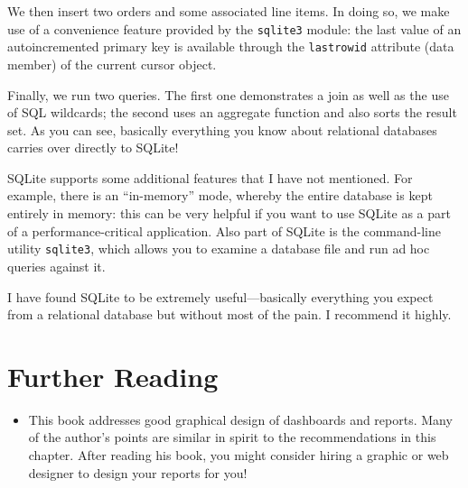 We then insert two orders and some associated line items. In doing so,
we make use of a convenience feature provided by the \texttt{sqlite3}
module: the last value of an autoincremented primary key is available
through the \texttt{lastrowid} attribute (data member) of the current
cursor object. 

Finally, we run two queries. The first one demonstrates a join as well
as the use of SQL wildcards; the second uses an aggregate function and
also sorts the result set. As you can see, basically everything you
know about relational databases carries over directly to SQLite! 

SQLite supports some additional features that I have not mentioned.
For example, there is an ``in-memory'' mode, whereby the entire
database is kept entirely in memory: this can be very helpful if you
want to use SQLite as a part of a performance-critical application.
Also part of SQLite is the command-line utility \texttt{sqlite3},
which allows you to examine a database file and run ad hoc queries
against it.

I have found SQLite to be extremely useful---basically everything you
expect from a relational database but without most of the pain. I
recommend it highly.


\section{Further Reading}

\begin{itemize}
\item {}

  This book addresses good graphical design of dashboards and
  reports.  Many of the author's points are similar in spirit to the
  recommendations in this chapter.  After reading his book, you might
  consider hiring a graphic or web designer to design your reports
  for you!
\end{itemize}


\clearpage

\thispagestyle{empty}

\cleardoublepage